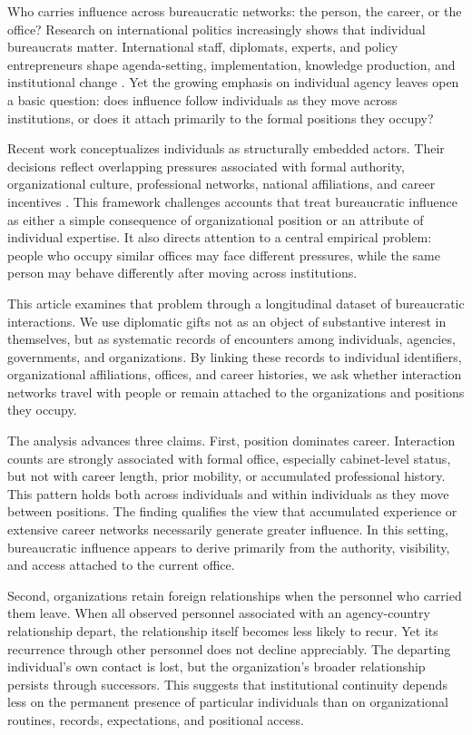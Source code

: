 \documentclass[11pt]{article}
\begin{document}
Who carries influence across bureaucratic networks: the person, the career, or the office? Research on international politics increasingly shows that individual bureaucrats matter. International staff, diplomats, experts, and policy entrepreneurs shape agenda-setting, implementation, knowledge production, and institutional change \citep{barnett2004rules,heinzel2022,lang2025,clark2026bureaucratic}. Yet the growing emphasis on individual agency leaves open a basic question: does influence follow individuals as they move across institutions, or does it attach primarily to the formal positions they occupy?

Recent work conceptualizes individuals as structurally embedded actors. Their decisions reflect overlapping pressures associated with formal authority, organizational culture, professional networks, national affiliations, and career incentives \citep{weaver2026bringing}. This framework challenges accounts that treat bureaucratic influence as either a simple consequence of organizational position or an attribute of individual expertise. It also directs attention to a central empirical problem: people who occupy similar offices may face different pressures, while the same person may behave differently after moving across institutions.

This article examines that problem through a longitudinal dataset of bureaucratic interactions. We use diplomatic gifts not as an object of substantive interest in themselves, but as systematic records of encounters among individuals, agencies, governments, and organizations. By linking these records to individual identifiers, organizational affiliations, offices, and career histories, we ask whether interaction networks travel with people or remain attached to the organizations and positions they occupy.

The analysis advances three claims. First, position dominates career. Interaction counts are strongly associated with formal office, especially cabinet-level status, but not with career length, prior mobility, or accumulated professional history. This pattern holds both across individuals and within individuals as they move between positions. The finding qualifies the view that accumulated experience or extensive career networks necessarily generate greater influence. In this setting, bureaucratic influence appears to derive primarily from the authority, visibility, and access attached to the current office.

Second, organizations retain foreign relationships when the personnel who carried them leave. When all observed personnel associated with an agency-country relationship depart, the relationship itself becomes less likely to recur. Yet its recurrence through other personnel does not decline appreciably. The departing individual’s own contact is lost, but the organization’s broader relationship persists through successors. This suggests that institutional continuity depends less on the permanent presence of particular individuals than on organizational routines, records, expectations, and positional access.
\end{document}
